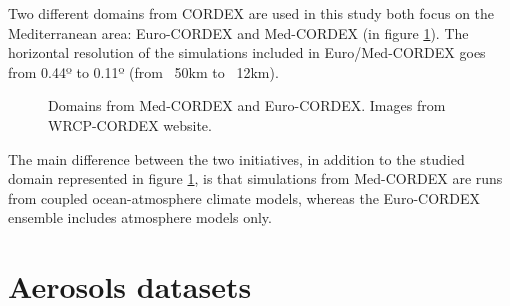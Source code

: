 Two different domains from CORDEX are used in this study both focus on the Mediterranean area: Euro-CORDEX and Med-CORDEX (in figure \ref{fig:cordexdomain}). The horizontal resolution of the simulations included in Euro/Med-CORDEX goes from 0.44º to 0.11º (from ~50km to ~12km).

\begin{figure}[!tbp]
  \centering
  \hfill
  \caption[The EURO and MED-CORDEX projects domains]{Domains from Med-CORDEX and Euro-CORDEX. Images from WRCP-CORDEX website.}
    \label{fig:cordexdomain}
\end{figure}

The main difference between the two initiatives, in addition to the studied domain represented in figure \ref{fig:cordexdomain}, is that simulations from Med-CORDEX \cite*{Ruti2016} are runs from coupled ocean-atmosphere climate models, whereas the Euro-CORDEX \cite*{Jacob2014} ensemble includes atmosphere models only. %


\section{Aerosols datasets}


